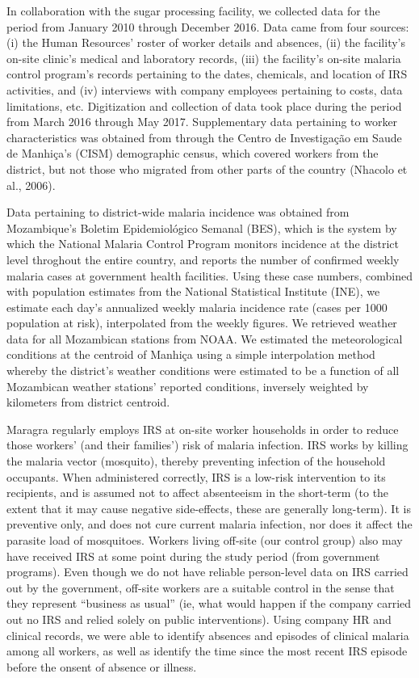 \documentclass[]{article}
\begin{document}
In collaboration with the sugar processing facility, we collected data
for the period from January 2010 through December 2016. Data came from
four sources: (i) the Human Resources' roster of worker details and
absences, (ii) the facility's on-site clinic's medical and laboratory
records, (iii) the facility's on-site malaria control program's records
pertaining to the dates, chemicals, and location of IRS activities, and
(iv) interviews with company employees pertaining to costs, data
limitations, etc. Digitization and collection of data took place during
the period from March 2016 through May 2017. Supplementary data
pertaining to worker characteristics was obtained from through the
Centro de Investigação em Saude de Manhiça's (CISM) demographic census,
which covered workers from the district, but not those who migrated from
other parts of the country (Nhacolo et al., 2006).

Data pertaining to district-wide malaria incidence was obtained from
Mozambique's Boletim Epidemiológico Semanal (BES), which is the system
by which the National Malaria Control Program monitors incidence at the
district level throghout the entire country, and reports the number of
confirmed weekly malaria cases at government health facilities. Using
these case numbers, combined with population estimates from the National
Statistical Institute (INE), we estimate each day's annualized weekly
malaria incidence rate (cases per 1000 population at risk), interpolated
from the weekly figures. We retrieved weather data for all Mozambican
stations from NOAA. We estimated the meteorological conditions at the
centroid of Manhiça using a simple interpolation method whereby the
district's weather conditions were estimated to be a function of all
Mozambican weather stations' reported conditions, inversely weighted by
kilometers from district centroid.

Maragra regularly employs IRS at on-site worker households in order to
reduce those workers' (and their families') risk of malaria infection.
IRS works by killing the malaria vector (mosquito), thereby preventing
infection of the household occupants. When administered correctly, IRS
is a low-risk intervention to its recipients, and is assumed not to
affect absenteeism in the short-term (to the extent that it may cause
negative side-effects, these are generally long-term). It is preventive
only, and does not cure current malaria infection, nor does it affect
the parasite load of mosquitoes. Workers living off-site (our control
group) also may have received IRS at some point during the study period
(from government programs). Even though we do not have reliable
person-level data on IRS carried out by the government, off-site workers
are a suitable control in the sense that they represent ``business as
usual'' (ie, what would happen if the company carried out no IRS and
relied solely on public interventions). Using company HR and clinical
records, we were able to identify absences and episodes of clinical
malaria among all workers, as well as identify the time since the most
recent IRS episode before the onsent of absence or illness.
\end{document}
